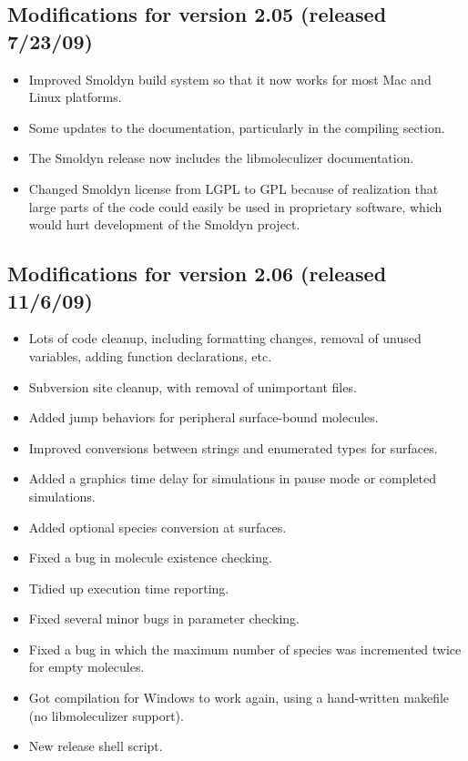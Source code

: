 \documentclass {scrbook}
\begin{document}
\subsection{Modifications for version 2.05 (released 7/23/09)}
\begin{itemize}
\item Improved Smoldyn build system so that it now works for most Mac and Linux platforms.
\item Some updates to the documentation, particularly in the compiling section.
\item The Smoldyn release now includes the libmoleculizer documentation.
\item Changed Smoldyn license from LGPL to GPL because of realization that large parts of the code could easily be used in proprietary software, which would hurt development of the Smoldyn project.
\end{itemize}

\subsection{Modifications for version 2.06 (released 11/6/09)}
\begin{itemize}
\item Lots of code cleanup, including formatting changes, removal of unused variables, adding function declarations, etc.
\item Subversion site cleanup, with removal of unimportant files.
\item Added jump behaviors for peripheral surface-bound molecules.
\item Improved conversions between strings and enumerated types for surfaces.
\item Added a graphics time delay for simulations in pause mode or completed simulations.
\item Added optional species conversion at surfaces.
\item Fixed a bug in molecule existence checking.
\item Tidied up execution time reporting.
\item Fixed several minor bugs in parameter checking.
\item Fixed a bug in which the maximum number of species was incremented twice for empty molecules.
\item Got compilation for Windows to work again, using a hand-written makefile (no libmoleculizer support).
\item New release shell script.
\end{itemize}
\end{document}
